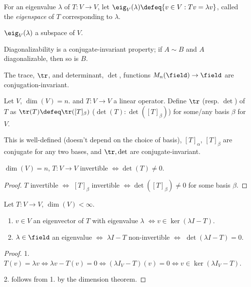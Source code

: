 \begin{definition}[Eigenspace]
    For an eigenvalue $\lambda$ of $T : V \to V$, let $\eig_V(\lambda) \defeq \{v \in V : Tv = \lambda v\}$, called the \emph{eigenspace} of $T$ corresponding to $\lambda$.
\end{definition}

\begin{proposition}
    $\eig_V(\lambda)$ a subspace of $V$.
\end{proposition}

\begin{remark}
Diagonalizability is a conjugate-invariant property; if $A \sim B$ and $A$ diagonalizable, then so is $B$. 
\end{remark}

\begin{proposition}
    The trace, $\tr$, and determinant, $\det$, functions $M_n(\field) \to \field$ are conjugation-invariant.
\end{proposition}

\begin{definition}
    Let $V$, $\dim(V) = n$. and $T: V \to V$ a linear operator. Define $\tr$ (resp. $\det$) of $T$ as $\tr(T) \defeq \tr([T]_\beta)$ ($\det(T) : \det([T]_\beta)$) for some/any basis $\beta$ for $V$.
\end{definition}

\begin{remark}
    This is well-defined (doesn't depend on the choice of basis), $[T]_\alpha$, $[T]_\beta$ are conjugate for any two bases, and $\tr, \det$ are conjugate-invariant.
\end{remark}

\begin{proposition}
    $\dim(V) = n$, $T : V \to V$ invertible $\iff \det(T) \neq 0$.
\end{proposition}
\begin{proof}
    $T$ invertible $\iff$ $[T]_\beta$ invertible $\iff \det([T]_\beta) \neq 0$ for some basis $\beta$.
\end{proof}

\begin{proposition}
    Let $T : V \to V$, $\dim(V) < \infty$.
    \begin{enumerate}
        \item $v \in V$ an eigenvector of $T$ with eigenvalue $\lambda$ $\iff v \in \ker(\lambda I - T)$.
        \item $\lambda \in \field$ an eigenvalue $\iff$ $\lambda I - T$ non-invertible $\iff$ $\det(\lambda I - T) = 0$.
    \end{enumerate}
\end{proposition}

\begin{proof}
    1. $T(v) = \lambda v \iff \lambda v - T(v) = 0 \iff (\lambda I_V - T)(v) = 0 \iff v \in \ker(\lambda I_V - T)$.

2. follows from 1. by the dimension theorem.
\end{proof}